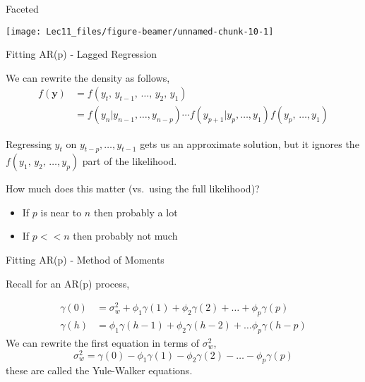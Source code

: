 \documentclass[11pt,ignorenonframetext,]{beamer}
\begin{document}
\begin{frame}{Faceted}
\protect\hypertarget{faceted}{}

\begin{center}\texttt{[image: Lec11\_files/figure-beamer/unnamed-chunk-10-1]} \end{center}

\end{frame}

\begin{frame}[t]{Fitting AR(p) - Lagged Regression}
\protect\hypertarget{fitting-arp---lagged-regression}{}

We can rewrite the density as follows, \[
\begin{aligned}
f(\symbf y)
  &= f(y_t, \,y_{t-1}, \,\ldots, \,y_{2}, \,y_{1}) \\
  &= f(y_{n}|y_{n-1},\ldots,y_{n-p}) \cdots  f(y_{p+1}|y_p,\ldots,y_1)  f(y_p, \,\ldots, y_1)
\end{aligned}
\]

\pause

Regressing \(y_t\) on \(y_{t-p}, \ldots, y_{t-1}\) gets us an
approximate solution, but it ignores the
\(f(y_1, \, y_2, \,\ldots, y_p)\) part of the likelihood.

How much does this matter (vs.~using the full likelihood)?

\begin{itemize}
\item
  If \(p\) is near to \(n\) then probably a lot
\item
  If \(p << n\) then probably not much
\end{itemize}

\end{frame}

\begin{frame}[t]{Fitting AR(p) - Method of Moments}
\protect\hypertarget{fitting-arp---method-of-moments}{}

Recall for an AR(p) process,

\[
\begin{aligned}
\gamma(0) &= \sigma^2_w + \phi_1 \gamma(1) + \phi_2 \gamma(2) + \ldots + \phi_p \gamma(p) \\
\gamma(h) &= \phi_1 \gamma(h-1) + \phi_2 \gamma(h-2) + \ldots \phi_p \gamma(h-p)
\end{aligned}
\] We can rewrite the first equation in terms of \(\sigma^2_w\), \[
\sigma^2_w =  \gamma(0) - \phi_1 \gamma(1) - \phi_2 \gamma(2) - \ldots - \phi_p \gamma(p)
\] these are called the Yule-Walker equations.

\end{frame}
\end{document}
